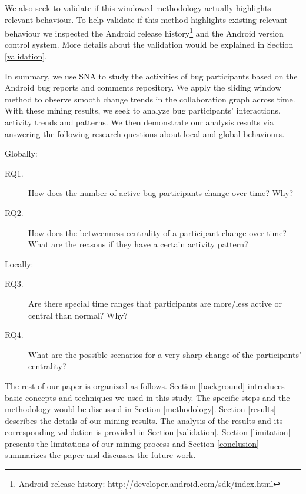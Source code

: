\documentclass[10pt, conference, compsocconf]{IEEEtran}
\begin{document}
We also seek to validate if this windowed methodology actually
highlights relevant behaviour.
To help validate if this method highlights existing relevant behaviour 
we inspected the Android release
history\footnote[1]{Android release history:
  http://developer.android.com/sdk/index.html} and the Android version
control system.
More details about the validation would be explained in Section
\ref{validation}.
 

In summary, we use SNA to study the activities of bug
participants based on the Android bug reports and comments
repository. 
We apply the sliding window method to observe smooth change trends
in the collaboration graph across time.
With these mining results, we seek to analyze bug participants'
interactions, activity trends and patterns. 
We then demonstrate our analysis results via answering the following
research questions about local and global behaviours.


Globally:

\begin{description}
\item[RQ1.] How does the number of active bug participants change over
  time? Why?
\item[RQ2.] How does the betweenness centrality of a participant change over
time? What are the reasons if they have a certain activity pattern?
\end{description}

Locally:
\begin{description}

\item[RQ3.] Are there special time ranges that participants are more/less
active or central than normal? Why?


\item[RQ4.] What are the possible scenarios for a very sharp change of the
participants' centrality?
\end{description}

% 
The rest of our paper is organized as follows. 
Section \ref{background} introduces basic concepts and techniques we
used in this study. 
The specific steps and the methodology would be discussed in Section
\ref{methodology}. 
Section \ref{results} describes the details of our mining results. 
The analysis of the results and its corresponding validation is
provided in Section \ref{validation}. 
Section \ref{limitation} presents the limitations of our mining
process and Section \ref{conclusion} summarizes the paper and
discusses the future work.
\end{document}
